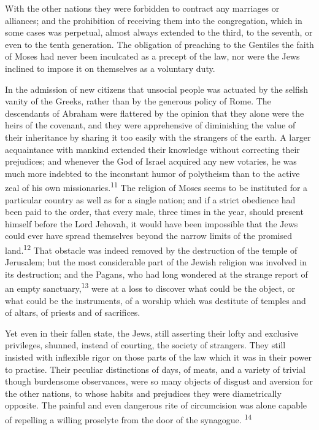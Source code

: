 With the other nations they were forbidden to contract any
marriages or alliances; and the prohibition of receiving them
into the congregation, which in some cases was perpetual, almost
always extended to the third, to the seventh, or even to the
tenth generation. The obligation of preaching to the Gentiles the
faith of Moses had never been inculcated as a precept of the law,
nor were the Jews inclined to impose it on themselves as a
voluntary duty.

In the admission of new citizens that unsocial people was
actuated by the selfish vanity of the Greeks, rather than by the
generous policy of Rome. The descendants of Abraham were
flattered by the opinion that they alone were the heirs of the
covenant, and they were apprehensive of diminishing the value of
their inheritance by sharing it too easily with the strangers of
the earth. A larger acquaintance with mankind extended their
knowledge without correcting their prejudices; and whenever the
God of Israel acquired any new votaries, he was much more
indebted to the inconstant humor of polytheism than to the active
zeal of his own missionaries.\textsuperscript{11} The religion of Moses seems to
be instituted for a particular country as well as for a single
nation; and if a strict obedience had been paid to the order,
that every male, three times in the year, should present himself
before the Lord Jehovah, it would have been impossible that the
Jews could ever have spread themselves beyond the narrow limits
of the promised land.\textsuperscript{12} That obstacle was indeed removed by the
destruction of the temple of Jerusalem; but the most considerable
part of the Jewish religion was involved in its destruction; and
the Pagans, who had long wondered at the strange report of an
empty sanctuary,\textsuperscript{13} were at a loss to discover what could be the
object, or what could be the instruments, of a worship which was
destitute of temples and of altars, of priests and of sacrifices.

Yet even in their fallen state, the Jews, still asserting their
lofty and exclusive privileges, shunned, instead of courting, the
society of strangers. They still insisted with inflexible rigor
on those parts of the law which it was in their power to
practise. Their peculiar distinctions of days, of meats, and a
variety of trivial though burdensome observances, were so many
objects of disgust and aversion for the other nations, to whose
habits and prejudices they were diametrically opposite. The
painful and even dangerous rite of circumcision was alone capable
of repelling a willing proselyte from the door of the synagogue. \textsuperscript{14}

